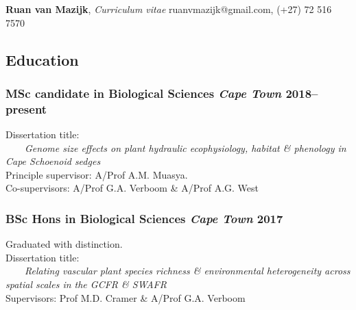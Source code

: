 \documentclass[10pt]{article}
\begin{document}
{\Large
\textbf{Ruan van Mazijk}, \textit{Curriculum vitae}
  \hfill ruanvmazijk@gmail.com, (+27) 72 516 7570
} \\
\hrulefill

\subsection*{Education}

\subsubsection*{%
  MSc candidate in Biological Sciences
  \textmd{\textit{Cape Town} \hfill 2018--present}
}

Dissertation title: \\
  \ \ \ \ \textit{Genome size effects on plant hydraulic ecophysiology, habitat
  \& phenology in Cape Schoenoid sedges} \\
Principle supervisor: A/Prof A.M. Muasya. \\
Co-supervisors: A/Prof G.A. Verboom \& A/Prof A.G. West

\subsubsection*{%
  BSc Hons in Biological Sciences
  \textmd{\textit{Cape Town} \hfill 2017}
}

Graduated with distinction. \\
Dissertation title: \\
  \ \ \ \ \textit{Relating vascular plant species richness \& environmental 
  heterogeneity across spatial scales in the GCFR \& SWAFR} \\
Supervisors: Prof M.D. Cramer \& A/Prof G.A. Verboom
\end{document}
